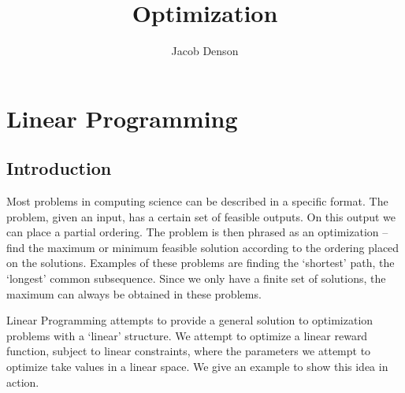 

\title{Optimization}
\author{Jacob Denson}


    \maketitle
    \tableofcontents

    \part{Linear Programming}

    \chapter{Introduction}

    Most problems in computing science can be described in a specific format. The problem, given an input, has a certain set of feasible outputs. On this output we can place a partial ordering. The problem is then phrased as an optimization -- find the maximum or minimum feasible solution according to the ordering placed on the solutions. Examples of these problems are finding the `shortest' path, the `longest' common subsequence. Since we only have a finite set of solutions, the maximum can always be obtained in these problems.

    Linear Programming attempts to provide a general solution to optimization problems with a `linear' structure. We attempt to optimize a linear reward function, subject to linear constraints, where the parameters we attempt to optimize take values in a linear space. We give an example to show this idea in action.


